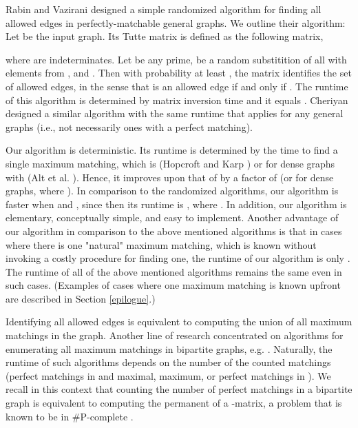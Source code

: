 \documentclass[times, 11pt]{article}
\begin{document}
Rabin and Vazirani \cite{RV89} designed a simple randomized algorithm for finding all allowed edges in perfectly-matchable general graphs.
We outline their algorithm: Let  be the input graph. Its Tutte matrix is defined as the following  matrix,

where  are indeterminates. Let  be any prime,  be a random substitition of all  with elements from , and .
Then with probability at least , the matrix  identifies the set of allowed edges, in the sense that
 is an allowed edge if and only if .
The runtime of this algorithm is determined by matrix inversion time and it equals . Cheriyan \cite{C97} designed a similar algorithm
with the same runtime that applies for any general graphs (i.e., not necessarily ones with a perfect matching).

Our algorithm is deterministic. Its runtime is determined by the time to find a single maximum matching,
which is  (Hopcroft and Karp \cite{HK}) or  for dense graphs with  (Alt et al. \cite{ABMP}).
Hence, it improves upon that of \cite{C94,CC05} by a factor of  (or  for dense graphs, where ).
In comparison to the randomized algorithms, our algorithm is faster when  and , since then its runtime is , where .
In addition, our algorithm is elementary, conceptually simple, and easy to implement.
Another advantage of our algorithm in comparison to the above mentioned algorithms is that in cases where there is one "natural" maximum matching, which
is known without invoking a costly procedure for finding one, the runtime of our algorithm is only . The runtime of all of the above mentioned algorithms
remains the same even in such cases. (Examples of cases where one maximum matching is known upfront are described in Section \ref{epilogue}.)

Identifying all allowed edges is equivalent to computing the union of all maximum matchings in the graph.
Another line of research concentrated on algorithms for enumerating all maximum matchings in bipartite graphs, e.g. \cite{FM94,Uno97,Uno01}.
Naturally, the runtime of such algorithms depends on the number of the counted matchings (perfect matchings in \cite{FM94,Uno01} and maximal, maximum, or perfect
matchings in \cite{Uno97}). We recall in this context that counting the number of perfect matchings in a bipartite
graph is equivalent to computing the permanent of
a -matrix, a problem that is known to be in \#P-complete \cite{val}.
\end{document}
